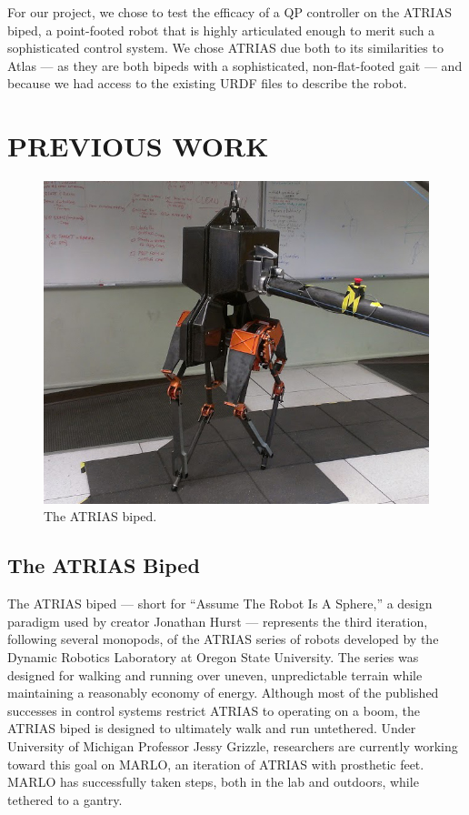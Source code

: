\documentclass[letterpaper, 10 pt, conference]{ieeeconf}  %
\begin{document}
For our project, we chose to test the efficacy of a QP controller on the ATRIAS biped, a point-footed robot that is highly articulated enough to merit such a sophisticated control system. We chose ATRIAS due both to its similarities to Atlas --- as they are both bipeds with a sophisticated, non-flat-footed gait --- and because we had access to the existing URDF files to describe the robot.

\section{PREVIOUS WORK}

   \begin{figure}[thpb]
      \centering
      \includegraphics[scale=0.3]{figures/atrias.jpg}
      \caption{The ATRIAS biped.}
      \label{atrias}
   \end{figure}

\subsection{The ATRIAS Biped}

The ATRIAS biped --- short for “Assume The Robot Is A Sphere,” a design paradigm used by creator Jonathan Hurst --- represents the third iteration, following several monopods, of the ATRIAS series of robots developed by the Dynamic Robotics Laboratory at Oregon State University. The series was designed for walking and running over uneven, unpredictable terrain while maintaining a reasonably economy of energy. \cite{site1} Although most of the published successes in control systems restrict ATRIAS to operating on a boom, the ATRIAS biped is designed to ultimately walk and run untethered. Under University of Michigan Professor Jessy Grizzle, researchers are currently working toward this goal on MARLO, an iteration of ATRIAS with prosthetic feet. MARLO has successfully taken steps, both in the lab and outdoors, while tethered to a gantry. \cite{site2}
\end{document}

